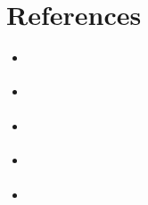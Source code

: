 \chapter{References}
\begin{itemize}
    \item \emph{\href{https://reactjs.org/docs/getting-started.html}{\color{cyan}{React.JS Docs}}}
    \item \emph{\href{https://docs.flutter.dev/}{\color{cyan}{Flutter Docs}}}
    \item \emph{\href{https://stackoverflow.com/}{\color{cyan}{Stackoverflow.com}}}
    \item \emph{\href{ https://mui.com/material-ui/getting-started/overview/}{\color{cyan}{MUI Docs}}}
    \item \emph{\href{ https://nodejs.org/it/docs/}{\color{cyan}{Node.JS Docs}}}
       
   
\end{itemize}